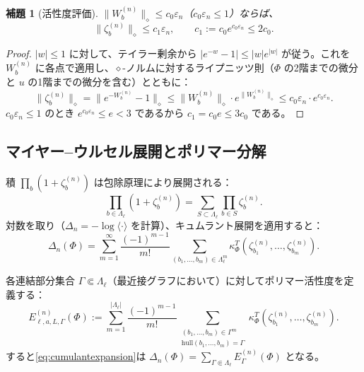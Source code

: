 \documentclass[12pt]{article}
\theoremstyle{plain}
\newtheorem{lemma}[theorem]{補題}
\theoremstyle{definition}
\numberwithin{equation}{section}
\begin{document}
\begin{lemma}[活性度評価]\label{lem:activity}
$\|W_b^{(n)}\|_\diamond\leq c_0\varepsilon_n$（$c_0\varepsilon_n\leq 1$）ならば、
\begin{equation}
\|\zeta_b^{(n)}\|_\diamond \leq c_1\varepsilon_n,\qquad c_1:=c_0 e^{c_0\varepsilon_n}\leq 2c_0.
\end{equation}
\end{lemma}

\begin{proof}
$|w|\leq 1$ に対して、テイラー剰余から $|e^{-w}-1|\leq|w|e^{|w|}$ が従う。これを $W_b^{(n)}$ に各点で適用し、$\diamond$-ノルムに対するライプニッツ則（$\Phi$ の2階までの微分と $u$ の1階までの微分を含む）とともに：
\begin{equation}
\|\zeta_b^{(n)}\|_\diamond = \|e^{-W_b^{(n)}}-1\|_\diamond \leq \|W_b^{(n)}\|_\diamond\cdot e^{\|W_b^{(n)}\|_\diamond} \leq c_0\varepsilon_n\cdot e^{c_0\varepsilon_n}.
\end{equation}
$c_0\varepsilon_n\leq 1$ のとき $e^{c_0\varepsilon_n}\leq e<3$ であるから $c_1=c_0 e\leq 3c_0$ である。
\end{proof}

\subsection{マイヤー--ウルセル展開とポリマー分解}

積 $\prod_b(1+\zeta_b^{(n)})$ は包除原理により展開される：
\begin{equation}
\prod_{b\in\Lambda_\ell}(1+\zeta_b^{(n)}) = \sum_{S\subset\Lambda_\ell}\prod_{b\in S}\zeta_b^{(n)}.
\end{equation}
対数を取り（$\Delta_n=-\log\langle\cdot\rangle$ を計算）、キュムラント展開を適用すると：
\begin{equation}\label{eq:cumulantexpansion}
\Delta_n(\Phi) = \sum_{m=1}^\infty\frac{(-1)^{m-1}}{m!}\sum_{(b_1,\ldots,b_m)\in\Lambda_\ell^m}\kappa_\Phi^T(\zeta_{b_1}^{(n)},\ldots,\zeta_{b_m}^{(n)}).
\end{equation}

各連結部分集合 $\Gamma\Subset\Lambda_\ell$（最近接グラフにおいて）に対してポリマー活性度を定義する：
\begin{equation}
E_{\ell,a,L,\Gamma}^{(n)}(\Phi) := \sum_{m=1}^{|\Lambda_\ell|}\frac{(-1)^{m-1}}{m!}\sum_{\substack{(b_1,\ldots,b_m)\in\Gamma^m\\\mathrm{hull}(b_1,\ldots,b_m)=\Gamma}}\kappa_\Phi^T(\zeta_{b_1}^{(n)},\ldots,\zeta_{b_m}^{(n)}).
\end{equation}
すると\eqref{eq:cumulantexpansion}は $\Delta_n(\Phi)=\sum_{\Gamma\Subset\Lambda_\ell}E_\Gamma^{(n)}(\Phi)$ となる。
\end{document}
